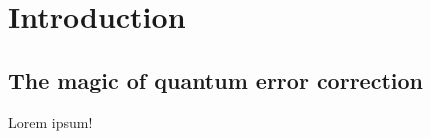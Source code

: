 \chapter[Introduction]{Introduction\label{ch:1_Introduction}}
\section{The magic of quantum error correction}

Lorem ipsum!